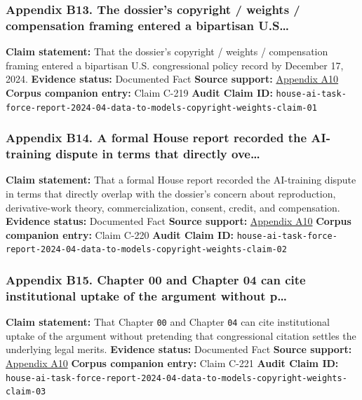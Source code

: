\documentclass[
  american,
  11pt,
  letterpaper,
]{article}
\begin{document}
\subsubsection{Appendix B13. The dossier's copyright / weights /
compensation framing entered a bipartisan
U.S\ldots{}}\label{appendix-b13-the-dossier-s-copyright-weights-compensation-framing-entered-a-bipartisan-u-s}

\textbf{Claim statement:} That the dossier's copyright / weights /
compensation framing entered a bipartisan U.S. congressional policy
record by December 17, 2024. \textbf{Evidence status:} Documented Fact
\textbf{Source support:}
\hyperref[appendix-a10-bipartisan-house-task-force-report-on-artificial-intelligence]{Appendix
A10} \textbf{Corpus companion entry:} Claim C-219 \textbf{Audit Claim
ID:}
\texttt{house-ai-task-force-report-2024-04-data-to-models-copyright-weights-claim-01}

\subsubsection{Appendix B14. A formal House report recorded the
AI-training dispute in terms that directly
ove\ldots{}}\label{appendix-b14-a-formal-house-report-recorded-the-ai-training-dispute-in-terms-that-directly-ove}

\textbf{Claim statement:} That a formal House report recorded the
AI-training dispute in terms that directly overlap with the dossier's
concern about reproduction, derivative-work theory, commercialization,
consent, credit, and compensation. \textbf{Evidence status:} Documented
Fact \textbf{Source support:}
\hyperref[appendix-a10-bipartisan-house-task-force-report-on-artificial-intelligence]{Appendix
A10} \textbf{Corpus companion entry:} Claim C-220 \textbf{Audit Claim
ID:}
\texttt{house-ai-task-force-report-2024-04-data-to-models-copyright-weights-claim-02}

\subsubsection{Appendix B15. Chapter 00 and Chapter 04 can cite
institutional uptake of the argument without
p\ldots{}}\label{appendix-b15-chapter-00-and-chapter-04-can-cite-institutional-uptake-of-the-argument-without-p}

\textbf{Claim statement:} That Chapter \texttt{00} and Chapter
\texttt{04} can cite institutional uptake of the argument without
pretending that congressional citation settles the underlying legal
merits. \textbf{Evidence status:} Documented Fact \textbf{Source
support:}
\hyperref[appendix-a10-bipartisan-house-task-force-report-on-artificial-intelligence]{Appendix
A10} \textbf{Corpus companion entry:} Claim C-221 \textbf{Audit Claim
ID:}
\texttt{house-ai-task-force-report-2024-04-data-to-models-copyright-weights-claim-03}
\end{document}
